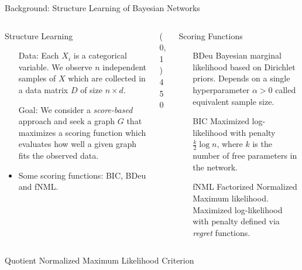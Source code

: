 \documentclass[final]{beamer}
\newcommand{\heading}[1]{\alert{\large #1}\\}
\theoremstyle{plain}
\begin{document}
\begin{frame}{}
\begin{block}{Background: Structure Learning of Bayesian Networks}
\begin{columns}[T]
   \begin{column}{0.25\textwidth} %
     \heading{Structure Learning}
     \vspace*{12pt}
     \begin{itemize}
     \setlength\itemsep{1em}
     \item[Data:] Each $X_i$ is a categorical variable. We observe $n$ independent samples of $X$ which are collected in a data matrix $D$ of size $n\times d$. 
     \item[Goal:] We consider a \textit{score-based} approach and seek a graph $G$ that maximizes a scoring function which evaluates how well a given graph fits the observed data.
     \item Some scoring functions: BIC, BDeu and fNML. 
   	 \end{itemize}
   \end{column}
  
   \begin{column}{0.005\textwidth}\linethickness{0.3ex} %
      \color{myPurple} \line(0,1){450}
   \end{column} %
   \begin{column}{0.3\textwidth}%
     \heading{Scoring Functions}
     \begin{itemize}
	 \vspace*{12pt}
	 \setlength\itemsep{1em}     
     \item[BDeu] Bayesian marginal likelihood based on Dirichlet priors. Depends on a single 
     hyperparameter $\alpha >0$ called equivalent sample size. 
     \item[BIC] Maximized log-likelihood with penalty $\frac{k}{2}\log n$, where $k$ is the number of free parameters in the network. 
     \item[fNML] Factorized Normalized Maximum likelihood. Maximized log-likelihood with penalty defined via \textit{regret} functions.
     \end{itemize}
     
   \end{column} %
\end{columns}
\end{block}


\begin{block}{Quotient Normalized Maximum Likelihood Criterion}
\begin{columns}[T]


\end{columns}
\end{block}
\end{frame}
\end{document}
